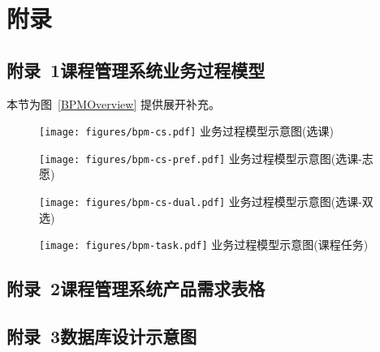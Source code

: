 \chapter*{附\qquad 录}

\section*{附录~1\quad	课程管理系统业务过程模型}
\label{sec:appendix-bpm}

本节为图~\ref{BPMOverview} 提供展开补充。

\begin{figure}[!hbp]
  \begin{center}
    \texttt{[image: figures/bpm-cs.pdf]}
    业务过程模型示意图(选课)\label{BPMCourseRegister}
  \end{center}
\end{figure}

\begin{figure}[!hbp]
  \begin{center}
    \texttt{[image: figures/bpm-cs-pref.pdf]}
    业务过程模型示意图(选课-志愿)\label{BPMCourseRegisterP}
  \end{center}
\end{figure}

\begin{figure}[!hbp]
  \begin{center}
    \texttt{[image: figures/bpm-cs-dual.pdf]}
    业务过程模型示意图(选课-双选)\label{BPMCourseRegisterD}
  \end{center}
\end{figure}

\begin{figure}[!hbp]
  \begin{center}
    \texttt{[image: figures/bpm-task.pdf]}
    业务过程模型示意图(课程任务)\label{BPMTask}
  \end{center}
\end{figure}

\newpage

\section*{附录~2\quad	课程管理系统产品需求表格}
\label{sec:appendix-requirement-table}


\newpage

\section*{附录~3\quad	数据库设计示意图}
\label{sec:appendix-database-diagram}

